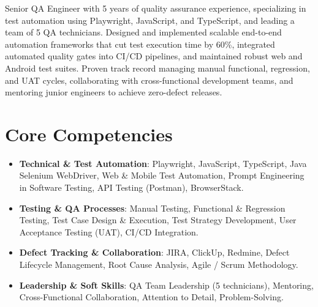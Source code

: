 \documentclass[11pt,a4paper,sans]{moderncv}
\begin{document}
\makecvtitle


\vspace{4pt}
\small{Senior QA Engineer with 5 years of quality assurance experience, specializing in test automation using Playwright, JavaScript, and TypeScript, and leading a team of 5 QA technicians. Designed and implemented scalable end-to-end automation frameworks that cut test execution time by 60\%, integrated automated quality gates into CI/CD pipelines, and maintained robust web and Android test suites. Proven track record managing manual functional, regression, and UAT cycles, collaborating with cross-functional development teams, and mentoring junior engineers to achieve zero-defect releases.}


\section{Core Competencies}
\vspace{1pt}
\begin{itemize}
\item \textbf{Technical \& Test Automation}: Playwright, JavaScript, TypeScript, Java Selenium WebDriver, Web \& Mobile Test Automation, Prompt Engineering in Software Testing, API Testing (Postman), BrowserStack.
\item \textbf{Testing \& QA Processes}: Manual Testing, Functional \& Regression Testing, Test Case Design \& Execution, Test Strategy Development, User Acceptance Testing (UAT), CI/CD Integration.
\item \textbf{Defect Tracking \& Collaboration}: JIRA, ClickUp, Redmine, Defect Lifecycle Management, Root Cause Analysis, Agile / Scrum Methodology.
\item \textbf{Leadership \& Soft Skills}: QA Team Leadership (5 technicians), Mentoring, Cross-Functional Collaboration, Attention to Detail, Problem-Solving.
\end{itemize}

\end{document}

